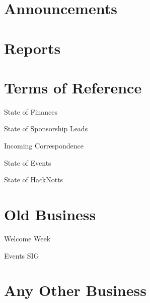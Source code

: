 \documentclass[11pt,hacksoc,agenda]{meetingmins}
\begin{document}
\maketitle

\section{Announcements}

\section{Reports}

\section{Terms of Reference}
\begin{items}
\item {State of Finances}
\item {State of Sponsorship Leads}
\item {Incoming Correspondence}
\item {State of Events}
\item {State of HackNotts}
\end{items}

\section{Old Business}
\begin{items}
\item {Welcome Week} 
\item {Events SIG}
\end{items}


\section{Any Other Business}

\vspace{1em}
\end{document}
